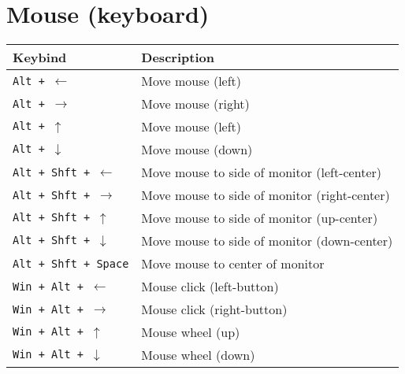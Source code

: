 \documentclass[letterpaper,12pt]{article}
\begin{document}
\section*{Mouse (keyboard)}
\begin{table}[H]
  \begin{tabular}{|C{5cm}|L{10cm}|}
    \hline
    \textbf{Keybind} & \textbf{Description} \\
    \hline
    {\tt Alt + $\leftarrow$} & Move mouse (left) \\
    {\tt Alt + $\rightarrow$} & Move mouse (right) \\
    {\tt Alt + $\uparrow$} & Move mouse (left) \\
    {\tt Alt + $\downarrow$} & Move mouse (down) \\
    \hline
    {\tt Alt + Shft + $\leftarrow$} & Move mouse to side of monitor (left-center) \\
    {\tt Alt + Shft + $\rightarrow$} & Move mouse to side of monitor (right-center) \\
    {\tt Alt + Shft + $\uparrow$} & Move mouse to side of monitor (up-center) \\
    {\tt Alt + Shft + $\downarrow$} & Move mouse to side of monitor (down-center) \\
    {\tt Alt + Shft + Space} & Move mouse to center of monitor \\
    \hline
    {\tt Win + Alt + $\leftarrow$} & Mouse click (left-button) \\
    {\tt Win + Alt + $\rightarrow$} & Mouse click (right-button) \\
    {\tt Win + Alt + $\uparrow$} & Mouse wheel (up) \\
    {\tt Win + Alt + $\downarrow$} & Mouse wheel (down) \\
    \hline
  \end{tabular}
\end{table}


\end{document}
